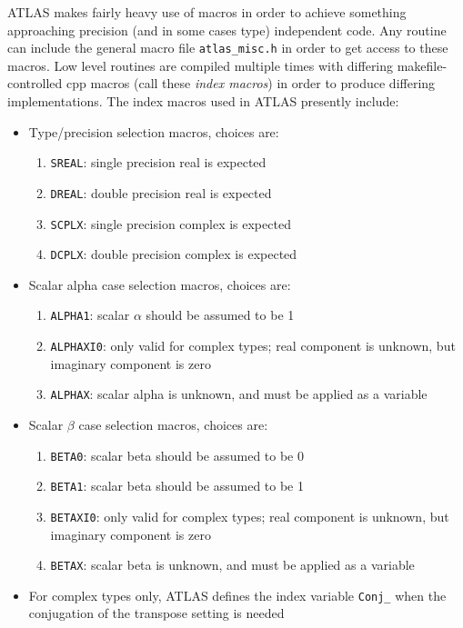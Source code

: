 \documentclass[11pt]{article}
\begin{document}
ATLAS makes fairly heavy use of macros in order to achieve something
approaching precision (and in some cases type) independent code. 
Any routine can include the
general macro file {\tt atlas\_misc.h} in order to get access to these
macros.  Low level routines are compiled multiple times with differing
makefile-controlled cpp macros (call these {\em index macros})
in order to produce differing implementations.  The index macros used
in ATLAS presently include:
\begin{itemize}
 \item Type/precision selection macros, choices are:
 \begin{enumerate}
 \item {\tt SREAL}: single precision real is expected
 \item {\tt DREAL}: double precision real is expected
 \item {\tt SCPLX}: single precision complex is expected
 \item {\tt DCPLX}: double precision complex is expected
 \end{enumerate}
 \item Scalar alpha case selection macros, choices are:
 \begin{enumerate}
 \item {\tt ALPHA1}: scalar $\alpha$ should be assumed to be 1
 \item {\tt ALPHAXI0}: only valid for complex types;
       real component is unknown, but imaginary component is zero
 \item {\tt ALPHAX}: scalar alpha is unknown, and must be applied as a variable
 \end{enumerate}
 \item Scalar $\beta$ case selection macros, choices are:
 \begin{enumerate}
 \item {\tt BETA0}: scalar beta should be assumed to be 0
 \item {\tt BETA1}: scalar beta should be assumed to be 1
 \item {\tt BETAXI0}: only valid for complex types;
       real component is unknown, but imaginary component is zero
 \item {\tt BETAX}: scalar beta is unknown, and must be applied as a variable
 \end{enumerate}
 \item For complex types only, ATLAS defines the index variable {\tt Conj\_}
       when the conjugation of the transpose setting is needed
\end{itemize}
\end{document}
